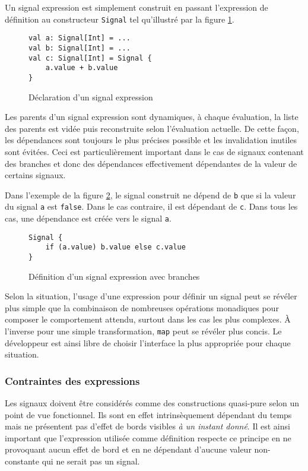 Un signal expression est simplement construit en passant l'expression de définition au constructeur \texttt{Signal} tel qu'illustré par la figure \ref{fig:signal-expr-init}.

\begin{figure}[!h]
	\begin{lstlisting}
val a: Signal[Int] = ...
val b: Signal[Int] = ...
val c: Signal[Int] = Signal {
	a.value + b.value
}
	\end{lstlisting}
	\caption{Déclaration d'un signal expression}
	\label{fig:signal-expr-init}
\end{figure}

Les parents d'un signal expression sont dynamiques, à chaque évaluation, la liste des parents est vidée puis reconstruite selon l'évaluation actuelle. De cette façon, les dépendances sont toujours le plus précises possible et les invalidation inutiles sont évitées. Ceci est particulièrement important dans le cas de signaux contenant des branches et donc des dépendances effectivement dépendantes de la valeur de certains signaux.

Dans l'exemple de la figure \ref{fig:signal-expr-branches}, le signal construit ne dépend de \texttt{b} que si la valeur du signal \texttt{a} est \texttt{false}. Dans le cas contraire, il est dépendant de \texttt{c}. Dans tous les cas, une dépendance est créée vers le signal \texttt{a}.

\begin{figure}[!h]
	\begin{lstlisting}
Signal {
	if (a.value) b.value else c.value
}
	\end{lstlisting}
	\caption{Définition d'un signal expression avec branches}
	\label{fig:signal-expr-branches}
\end{figure}

Selon la situation, l'usage d'une expression pour définir un signal peut se révéler plus simple que la combinaison de nombreuses opérations monadiques pour composer le comportement attendu, surtout dans les cas les plus complexes. À l'inverse pour une simple transformation, \texttt{map} peut se révéler plus concis. Le développeur est ainsi libre de choisir l'interface la plus appropriée pour chaque situation.

\subsubsection{Contraintes des expressions}

Les signaux doivent être considérés comme des constructions quasi-pure selon un point de vue fonctionnel. Ils sont en effet intrinsèquement dépendant du temps mais ne présentent pas d'effet de bords visibles \emph{à un instant donné}. Il est ainsi important que l'expression utilisée comme définition respecte ce principe en ne provoquant aucun effet de bord et en ne dépendant d'aucune valeur non-constante qui ne serait pas un signal.

